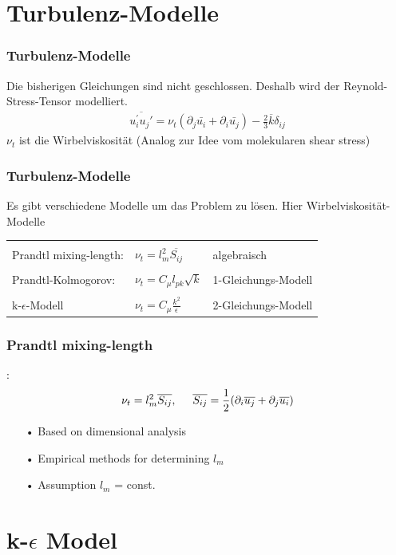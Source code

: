 \documentclass[11pt,t]{beamer}
\newcommand*\mean[1]{\overline{#1}}
\begin{document}
\section{Turbulenz-Modelle}
\begin{frame}
\frametitle{Turbulenz-Modelle}
Die bisherigen Gleichungen sind nicht geschlossen. Deshalb wird der Reynold-Stress-Tensor modelliert.
\begin{align*}
\overline{u_i^{'}u_j{'}} = \nu_t(\partial_j \bar{u_i} + \partial_i \bar{u_j})-\frac{2}{3}\mean{k}\delta_{ij}
\end{align*}
$\nu_t$ ist die Wirbelviskosität (Analog zur Idee vom molekularen shear stress) 
\end{frame}
\begin{frame}
\frametitle{Turbulenz-Modelle}
Es gibt verschiedene Modelle um das Problem zu lösen. Hier Wirbelviskosität-Modelle\\
\begin{tabular}{l l l}
&\\
Prandtl mixing-length: & $\nu_t = l_m^2\overline{S_{ij}}$& algebraisch\\
&\\
Prandtl-Kolmogorov: &$\nu_t = C_\mu l_{pk}\sqrt{k}$& 1-Gleichungs-Modell\\
&\\
k-$\epsilon$-Modell & $\nu_t = C_\mu \frac{k^2}{\epsilon}$& 2-Gleichungs-Modell\\
\end{tabular}
\end{frame}
\begin{frame}
\frametitle{Prandtl mixing-length}:
\begin{equation}
\nu_t = l_m^2\overline{S_{ij}},\hspace{0.5cm}\overline{S_{ij}} = \frac{1}{2}(\partial_i \overline{u_j} + \partial_j \overline{u_i})
\end{equation}
\begin{itemize}
\item[•]Based on dimensional analysis
\item[•]Empirical methods for determining $l_m$
\item[•]Assumption $l_m$ = const.
\end{itemize}
\end{frame}

\section{k-$\epsilon$ Model}
\end{document}
